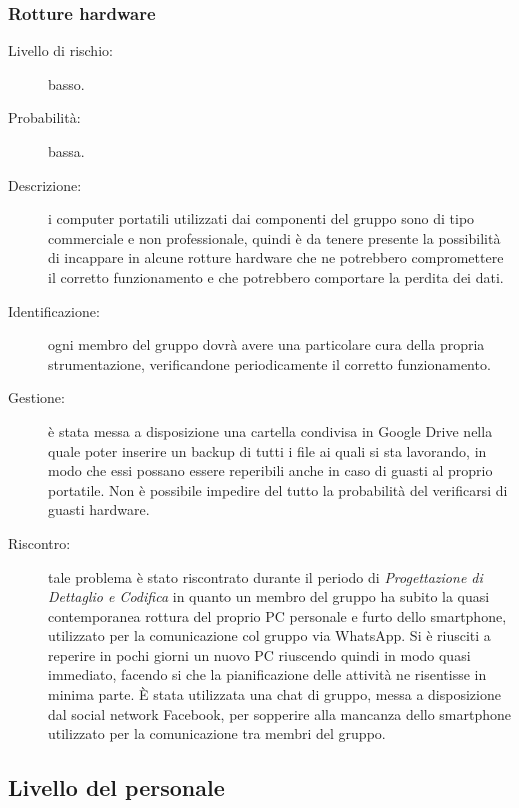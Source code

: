\subsubsection{Rotture hardware}
\begin{description}
	\item[Livello di rischio:] basso.
	\item[Probabilità:] bassa.
	\item[Descrizione:] i computer portatili utilizzati dai componenti del gruppo sono di tipo commerciale e non professionale, quindi è da tenere presente la possibilità di incappare in alcune rotture hardware che ne potrebbero compromettere il corretto funzionamento e che potrebbero comportare la perdita dei dati.
	\item[Identificazione:] ogni membro del gruppo dovrà avere una particolare cura della propria strumentazione, verificandone periodicamente il corretto funzionamento.
	\item[Gestione:] è stata messa a disposizione una cartella condivisa in \gls{Google Drive} nella quale poter inserire un backup di tutti i file ai quali si sta lavorando, in modo che essi possano essere reperibili anche in caso di guasti al proprio portatile. Non è possibile impedire del tutto la probabilità del verificarsi di guasti hardware.
	\item[Riscontro:] tale problema è stato riscontrato durante il periodo di \textit{Progettazione di Dettaglio e Codifica} in quanto un membro del gruppo ha subito la quasi contemporanea rottura del proprio PC personale e furto dello smartphone, utilizzato per la comunicazione col gruppo via WhatsApp. Si è riusciti a reperire in pochi giorni un nuovo PC riuscendo quindi in modo quasi immediato, facendo si che la pianificazione delle attività ne risentisse in minima parte. È stata utilizzata una chat di gruppo, messa a disposizione dal social network \gls{Facebook}, per sopperire alla mancanza dello smartphone utilizzato per la comunicazione tra membri del gruppo.  
\end{description}

\subsection{Livello del personale}

